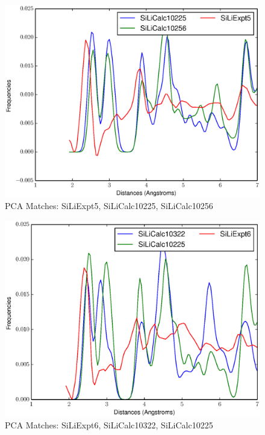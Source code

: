 \documentclass[12pt,letterpaper]{article}
\begin{document}
\begin{figure}[ht]
  \begin{center}
    \includegraphics[scale=0.8]{figs/PC3MatchSiLiExpt5-SiLiCalc10225-SiLiCalc10256.eps}
    \caption{PCA Matches: SiLiExpt5, SiLiCalc10225, SiLiCalc10256}
  \end{center}
\end{figure}

\begin{figure}[ht]
  \begin{center}
    \includegraphics[scale=0.8]{figs/PC3MatchSiLiExpt6-SiLiCalc10322-SiLiCalc10225.eps}
    \caption{PCA Matches: SiLiExpt6, SiLiCalc10322, SiLiCalc10225}
  \end{center}
\end{figure}
\end{document}
